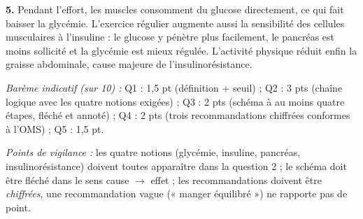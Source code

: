 \documentclass[11pt]{article}
\begin{document}
\begin{corrige}
\textbf{5.} Pendant l'effort, les muscles consomment du glucose directement, ce qui fait baisser la glycémie. L'exercice régulier augmente aussi la sensibilité des cellules musculaires à l'insuline : le glucose y pénètre plus facilement, le pancréas est moins sollicité et la glycémie est mieux régulée. L'activité physique réduit enfin la graisse abdominale, cause majeure de l'insulinorésistance.

\emph{Barème indicatif (sur 10) :} Q1 : 1,5 pt (définition + seuil) ; Q2 : 3 pts (chaîne logique avec les quatre notions exigées) ; Q3 : 2 pts (schéma à au moins quatre étapes, fléché et annoté) ; Q4 : 2 pts (trois recommandations chiffrées conformes à l'OMS) ; Q5 : 1,5 pt.

\emph{Points de vigilance :} les quatre notions (glycémie, insuline, pancréas, insulinorésistance) doivent toutes apparaître dans la question 2 ; le schéma doit être fléché dans le sens cause $\to$ effet ; les recommandations doivent être \emph{chiffrées}, une recommandation vague (« manger équilibré ») ne rapporte pas de point.
\end{corrige}
\end{document}
